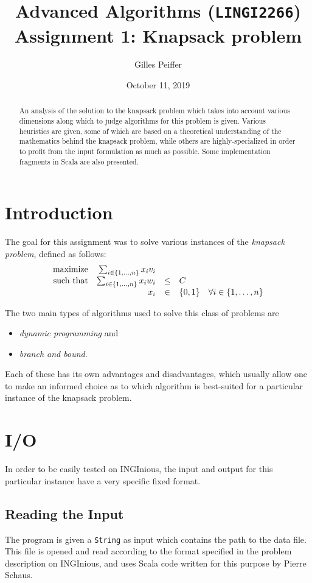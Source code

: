 \documentclass[journal]{IEEEtran}
\title{Advanced Algorithms (\texttt{LINGI2266}) \\ Assignment 1: Knapsack problem}
\author{Gilles Peiffer}
\date{October 11, 2019}
\newcommand{\scala}[1]{\texttt{#1}}
\begin{document}
\maketitle

\begin{abstract}
	An analysis of the solution to the knapsack problem which takes into account various dimensions along which to judge algorithms for this problem is given.
	Various heuristics are given, some of which are based on a theoretical understanding of the mathematics behind the knapsack problem, while others are highly-specialized in order to profit from the input formulation as much as possible.
	Some implementation fragments in Scala are also presented.
\end{abstract}

\section{Introduction}
\label{sec:intro}
The goal for this assignment was to solve various instances of the \emph{knapsack problem}, defined as follows:
\[
\begin{array}{rrcl@{\quad}l}
\textnormal{maximize} & \sum_{i \in \{1, \ldots, n\}} x_i v_i &&& \\
\textnormal{such that} & \sum_{i \in \{1, \ldots, n\}} x_i w_i & \le & C &\\
& x_i & \in & \{0, 1\} & \forall i \in \{1, \ldots, n\}
\end{array}
\]

The two main types of algorithms used to solve this class of problems are
\begin{itemize}
	\item \emph{dynamic programming} and
	\item \emph{branch and bound}.
\end{itemize}
Each of these has its own advantages and disadvantages, which usually allow one to make an informed choice as to which algorithm is best-suited for a particular instance of the knapsack problem.

\section{I/O}
In order to be easily tested on INGInious, the input and output for this particular instance have a very specific fixed format.
\subsection{Reading the Input}
The program is given a \scala{String} as input which contains the path to the data file.
This file is opened and read according to the format specified in the problem description on INGInious, and uses Scala code written for this purpose by Pierre Schaus.
\end{document}
